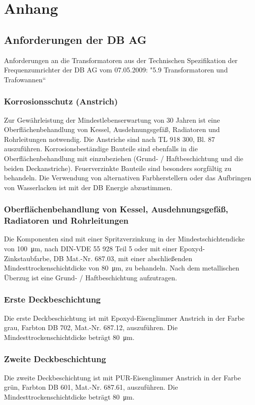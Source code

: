 \appendix
\section{Anhang}
\subsection{Anforderungen der DB AG}
Anforderungen an die Transformatoren aus der Technischen Spezifikation der Frequenzumrichter
der DB AG vom 07.05.2009: 
"5.9 Transformatoren und Trafowannen“

\subsubsection*{Korrosionsschutz (Anstrich)}
Zur Gewährleistung der Mindestlebenserwartung von 30 Jahren ist eine Oberflächenbehandlung von Kessel, Ausdehnungsgefäß, Radiatoren und Rohrleitungen notwendig. Die Anstriche sind nach TL 918 300, Bl. 87 auszuführen. Korrosionsbeständige Bauteile sind ebenfalls in die Oberflächenbehandlung mit einzubeziehen (Grund- / Haftbeschichtung und die beiden Deckanstriche).
Feuerverzinkte Bauteile sind besonders sorgfältig zu behandeln.
Die Verwendung von alternativen Farbherstellern oder das Aufbringen von Wasserlacken ist mit der 
DB Energie abzustimmen.

\subsubsection*{Oberflächenbehandlung von Kessel, Ausdehnungsgefäß, Radiatoren und Rohrleitungen}
Die Komponenten sind mit einer Spritzverzinkung in der Mindestschichtendicke von \SI{100}{\um}, nach DIN-VDE 55 928 Teil 5 oder mit einer Epoxyd-Zinkstaubfarbe, DB Mat.-Nr. 687.03, mit einer abschließenden Mindesttrockenschichtdicke von \SI[]{80}{\um}, zu behandeln. Nach dem metallischen Überzug ist eine Grund- / Haftbeschichtung aufzutragen.

\subsubsection*{Erste Deckbeschichtung}
Die erste Deckbeschichtung ist mit Epoxyd-Eisenglimmer Anstrich in der Farbe grau, Farbton DB 702, Mat.-Nr. 687.12, auszuführen. Die Mindesttrockenschichtdicke beträgt \SI{80}{\um}.

\subsubsection*{Zweite Deckbeschichtung}
Die zweite Deckbeschichtung ist mit PUR-Eisenglimmer Anstrich in der Farbe grün, Farbton DB 601, Mat.-Nr. 687.61, auszuführen. Die Mindesttrockenschichtdicke beträgt \SI{80}{\um}.

